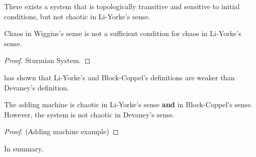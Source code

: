 \documentclass[12pt,twoside,draft]{book}
\begin{document}
There exists a system that is topologically transitive and sensitive to initial conditions, but not chaotic in Li-Yorke's sense.
\begin{theorem}
  \citep{blanchard}
  Chaos in Wiggins's sense is not a sufficient condition for chaos in Li-Yorke's sense.  
  \begin{proof}
    Sturmian System.
  \end{proof}
\end{theorem}

\citet{aulbach} has shown that Li-Yorke's and Block-Coppel's definitions are weaker than Devaney's definition.
\begin{theorem}
  \citep{aulbach} 
  The adding machine is chaotic in Li-Yorke's sense \textbf{and} in Block-Coppel's sense.
  However, the system is not chaotic in Devaney's sense.
  \begin{proof}
    (Adding machine example)
  \end{proof}
\end{theorem}

In summary,




\printindex
\end{document}
